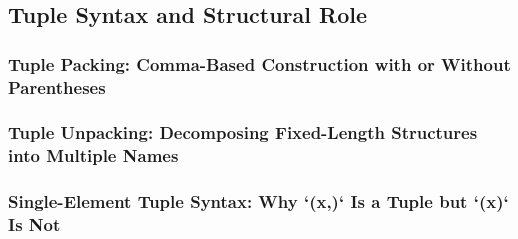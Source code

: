 \subsection{Tuple Syntax and Structural Role}
\subsubsection{Tuple Packing: Comma-Based Construction with or Without Parentheses}
\subsubsection{Tuple Unpacking: Decomposing Fixed-Length Structures into Multiple Names}
\subsubsection{Single-Element Tuple Syntax: Why `(x,)` Is a Tuple but `(x)` Is Not}
